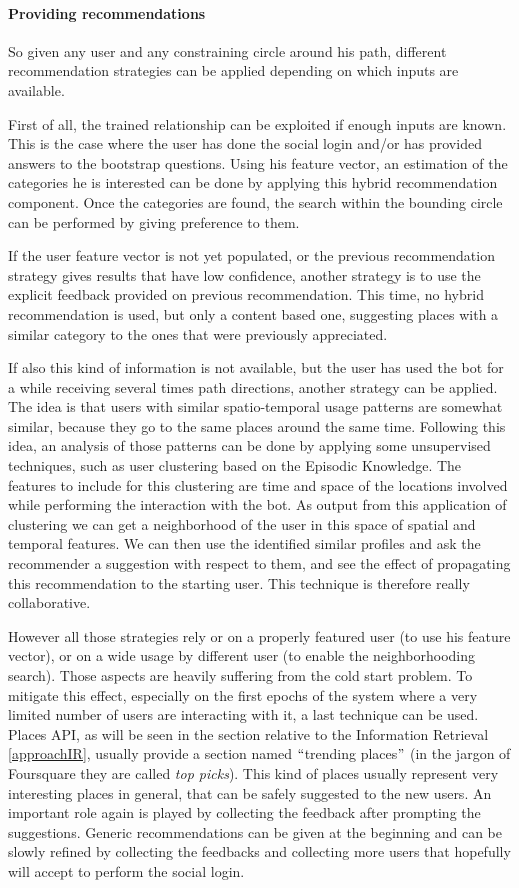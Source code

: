 \paragraph{Providing recommendations}
So given any user and any constraining circle around his path, different recommendation strategies can be applied depending on which inputs are available.

First of all, the trained relationship can be exploited if enough inputs are known. This is the case where the user has done the social login and/or has provided answers to the bootstrap questions. Using his feature vector, an estimation of the categories he is interested can be done by applying this hybrid recommendation component. Once the categories are found, the search within the bounding circle can be performed by giving preference to them.

If the user feature vector is not yet populated, or the previous recommendation strategy gives results that have low confidence, another strategy is to use the explicit feedback provided on previous recommendation. This time, no hybrid recommendation is used, but only a content based one, suggesting places with a similar category to the ones that were previously appreciated.

If also this kind of information is not available, but the user has used the bot for a while receiving several times path directions, another strategy can be applied. The idea is that users with similar spatio-temporal usage patterns are somewhat similar, because they go to the same places around the same time. Following this idea, an analysis of those patterns can be done by applying some unsupervised techniques, such as user clustering based on the Episodic Knowledge. The features to include for this clustering are time and space of the locations involved while performing the interaction with the bot. As output from this application of clustering we can get a neighborhood of the user in this space of spatial and temporal features. We can then use the identified similar profiles and ask the recommender a suggestion with respect to them, and see the effect of propagating this recommendation to the starting user. This technique is therefore really collaborative.

However all those strategies rely or on a properly featured user (to use his feature vector), or on a wide usage by different user (to enable the neighborhooding search). Those aspects are heavily suffering from the cold start problem. To mitigate this effect, especially on the first epochs of the system where a very limited number of users are interacting with it, a last technique can be used. Places API, as will be seen in the section relative to the Information Retrieval \ref{approachIR}, usually provide a section named $``$trending places$"$  (in the jargon of Foursquare they are called \textit{top picks}). This kind of places usually represent very interesting places in general, that can be safely suggested to the new users. An important role again is played by collecting the feedback after prompting the suggestions. Generic recommendations can be given at the beginning and can be slowly refined by collecting the feedbacks and collecting more users that hopefully will accept to perform the social login.

